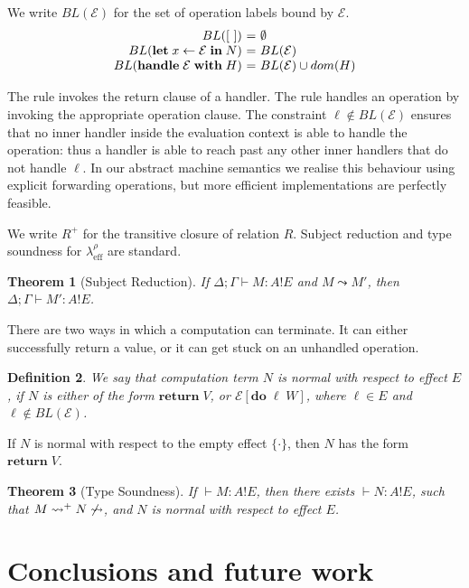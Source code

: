 \documentclass[12pt,mscres,cdtppar,twoside,openright,logo,rightchapter,normalheadings]{infthesis}
\makeatletter
\newtheorem{theorem}{Theorem}[section]
\newtheorem{definition}[theorem]{Definition}
\theoremstyle{definition}
\newcommand{\Calc}{\ensuremath{\lambda_{\text{eff}}^\rho}\xspace}
\newcommand{\semlab}[1]{\text{\scshape{S-#1}}}
\newcommand{\revto}{\ensuremath{\leftarrow}}
\newcommand{\keyw}[1]{\textbf{#1}}
\newcommand{\Handle}{\keyw{handle}}
\newcommand{\With}{\keyw{with}}
\newcommand{\Let}{\keyw{let}}
\newcommand{\In}{\keyw{in}}
\newcommand{\Do}{\keyw{do}}
\newcommand{\Return}{\keyw{return}}
\newcommand{\eff}{!}
\newcommand{\typc}[3]{#1 \vdash #2 \eff #3}
\newcommand{\reducesto}[0]{\ensuremath{\leadsto}}
\newcommand{\ba}{\begin{array}}
\newcommand{\ea}{\end{array}}
\newenvironment{equations}{\[\ba{@{}r@{~}c@{~}l@{}}}{\ea\]\ignorespacesafterend}
\makeatother
\begin{document}
We write $BL(\mathcal{E})$ for the set of operation labels bound by
$\mathcal{E}$.
\begin{equations}
BL([~])                            &=& \emptyset \\
BL(\Let\;x \revto \mathcal{E}\;\In\;N)    &=& BL(\mathcal{E}) \\
BL(\Handle\;\mathcal{E}\;\With\;H) &=& BL(\mathcal{E}) \cup dom(H) \\
\end{equations}

The rule \semlab{Handle-Ret} invokes the return clause of a
handler. The rule \semlab{Handle-op} handles an operation by invoking
the appropriate operation clause. The constraint $\ell \notin
BL(\mathcal{E})$ ensures that no inner handler inside the evaluation
context is able to handle the operation: thus a handler is able to
reach past any other inner handlers that do not handle $\ell$. In our
abstract machine semantics we realise this behaviour using explicit
forwarding operations, but more efficient implementations are
perfectly feasible.


We write $R^+$ for the transitive closure of relation $R$.
%
Subject reduction and type soundness for $\Calc$ are standard.

\begin{theorem}[Subject Reduction]
If $\typc{\Delta;\Gamma}{M : A}{E}$ and $M \reducesto M'$, then
$\typc{\Delta;\Gamma}{M' : A}{E}$.
\end{theorem}

There are two ways in which a computation can terminate. It can either
successfully return a value, or it can get stuck on an unhandled
operation.
\begin{definition}
We say that computation term $N$ is normal with respect to effect $E$,
if $N$ is either of the form $\Return\;V$, or
$\mathcal{E}[\Do\;\ell\;W]$, where $\ell \in E$ and $\ell \notin
BL(\mathcal{E})$.
\end{definition}
If $N$ is normal with respect to the empty effect $\{\cdot\}$, then
$N$ has the form $\Return\;V$.

\begin{theorem}[Type Soundness]
If $\typc{}{M : A}{E}$, then there exists $\typc{}{N : A}{E}$, such that
$M \reducesto^+ N \not\reducesto$, and $N$ is normal with respect to
effect $E$.
\end{theorem}

\chapter{Conclusions and future work}
\label{ch:conclusions}
\end{document}
